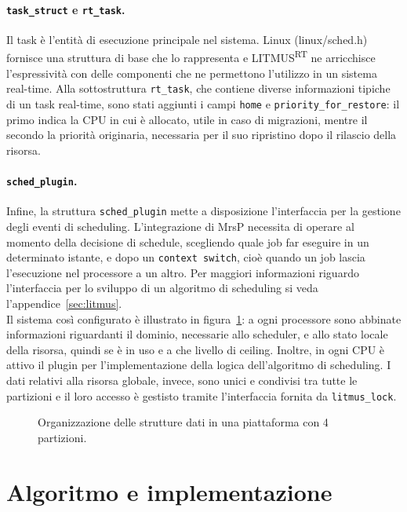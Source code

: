 \paragraph{\texttt{task\_struct} e \texttt{rt\_task}.} Il task è l'entità di esecuzione principale nel sistema. Linux (linux/sched.h) fornisce una struttura di base che lo rappresenta e LITMUS\textsuperscript{RT} ne arricchisce l'espressività con delle componenti che ne permettono l'utilizzo in un sistema real-time. Alla sottostruttura \texttt{rt\_task}, che contiene diverse informazioni tipiche di un task real-time, sono stati aggiunti i campi \texttt{home} e \texttt{priority\_for\_restore}: il primo indica la CPU in cui è allocato, utile in caso di migrazioni, mentre il secondo la priorità originaria, necessaria per il suo ripristino dopo il rilascio della risorsa.

\paragraph{\texttt{sched\_plugin}.} Infine, la struttura \texttt{sched\_plugin} mette a disposizione l'interfaccia per la gestione degli eventi di scheduling. L'integrazione di MrsP necessita di operare al momento della decisione di schedule, scegliendo quale job far eseguire in un determinato istante, e dopo un \texttt{context switch}, cioè quando un job lascia l'esecuzione nel processore a un altro. Per maggiori informazioni riguardo l'interfaccia per lo sviluppo di un algoritmo di scheduling si veda l'appendice~\ref{sec:litmus}.\\

Il sistema così configurato è illustrato in figura~\ref{fig:impl.system}: a ogni processore sono abbinate informazioni riguardanti il dominio, necessarie allo scheduler, e allo stato locale della risorsa, quindi se è in uso e a che livello di ceiling. Inoltre, in ogni CPU è attivo il plugin per l'implementazione della logica dell'algoritmo di scheduling. I dati relativi alla risorsa globale, invece, sono unici e condivisi tra tutte le partizioni e il loro accesso è gestisto tramite l'interfaccia fornita da \texttt{litmus\_lock}.

\begin{figure}
\centering
{}
\caption{Organizzazione delle strutture dati in una piattaforma con 4 partizioni.}
\label{fig:impl.system}
\end{figure}

\section{Algoritmo e implementazione}
\label{sec:impl.alg}

